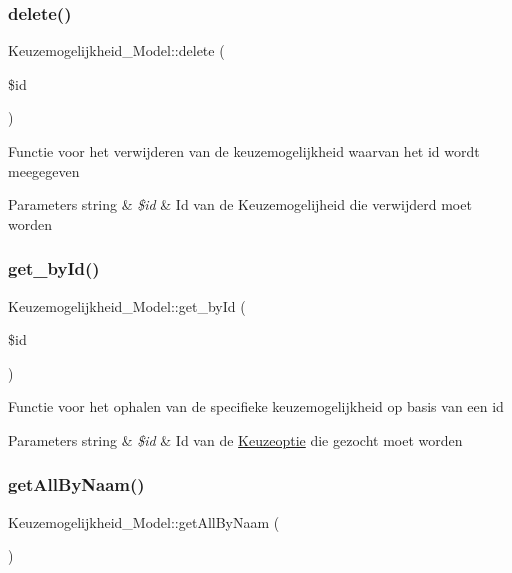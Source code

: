 \subsubsection{\texorpdfstring{delete()}{delete()}}
{\footnotesize\ttfamily Keuzemogelijkheid\+\_\+\+Model\+::delete (\begin{DoxyParamCaption}\item[{}]{\$id }\end{DoxyParamCaption})}

Functie voor het verwijderen van de keuzemogelijkheid waarvan het id wordt meegegeven 
\begin{DoxyParams}[1]{Parameters}
string & {\em \$id} & Id van de Keuzemogelijheid die verwijderd moet worden \\
\hline
\end{DoxyParams}
\mbox{\label{class_keuzemogelijkheid___model_a88c8b0a6b02a7da7c5d1d573a66c11c7}} 
\subsubsection{\texorpdfstring{get\+\_\+by\+Id()}{get\_byId()}}
{\footnotesize\ttfamily Keuzemogelijkheid\+\_\+\+Model\+::get\+\_\+by\+Id (\begin{DoxyParamCaption}\item[{}]{\$id }\end{DoxyParamCaption})}

Functie voor het ophalen van de specifieke keuzemogelijkheid op basis van een id 
\begin{DoxyParams}[1]{Parameters}
string & {\em \$id} & Id van de \mbox{\hyperlink{class_keuzeoptie}{Keuzeoptie}} die gezocht moet worden \\
\hline
\end{DoxyParams}
\mbox{\label{class_keuzemogelijkheid___model_a0dd8e66ae398c5e3ab1c39b62d24cf21}} 
\subsubsection{\texorpdfstring{get\+All\+By\+Naam()}{getAllByNaam()}}
{\footnotesize\ttfamily Keuzemogelijkheid\+\_\+\+Model\+::get\+All\+By\+Naam (\begin{DoxyParamCaption}{ }\end{DoxyParamCaption})}


